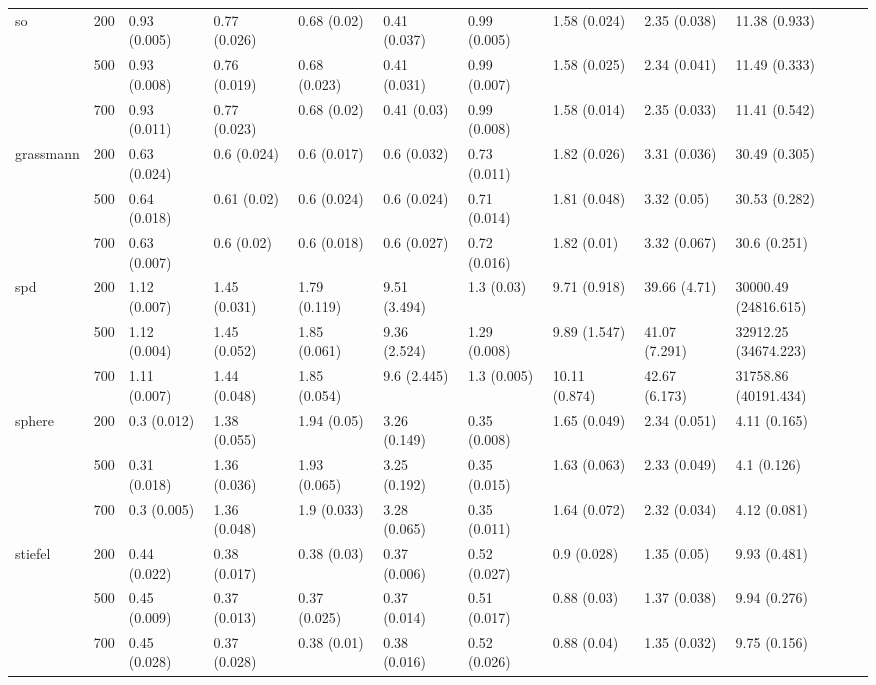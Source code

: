 \begin{tabular}{llllllllll}
\cline{1-10}
\multirow[t]{3}{*}{so} & 200 & 0.93 (0.005) & 0.77 (0.026) & 0.68 (0.02) & 0.41 (0.037) & 0.99 (0.005) & 1.58 (0.024) & 2.35 (0.038) & 11.38 (0.933) \\
 & 500 & 0.93 (0.008) & 0.76 (0.019) & 0.68 (0.023) & 0.41 (0.031) & 0.99 (0.007) & 1.58 (0.025) & 2.34 (0.041) & 11.49 (0.333) \\
 & 700 & 0.93 (0.011) & 0.77 (0.023) & 0.68 (0.02) & 0.41 (0.03) & 0.99 (0.008) & 1.58 (0.014) & 2.35 (0.033) & 11.41 (0.542) \\
\cline{1-10}
\multirow[t]{3}{*}{grassmann} & 200 & 0.63 (0.024) & 0.6 (0.024) & 0.6 (0.017) & 0.6 (0.032) & 0.73 (0.011) & 1.82 (0.026) & 3.31 (0.036) & 30.49 (0.305) \\
 & 500 & 0.64 (0.018) & 0.61 (0.02) & 0.6 (0.024) & 0.6 (0.024) & 0.71 (0.014) & 1.81 (0.048) & 3.32 (0.05) & 30.53 (0.282) \\
 & 700 & 0.63 (0.007) & 0.6 (0.02) & 0.6 (0.018) & 0.6 (0.027) & 0.72 (0.016) & 1.82 (0.01) & 3.32 (0.067) & 30.6 (0.251) \\
\cline{1-10}
\multirow[t]{3}{*}{spd} & 200 & 1.12 (0.007) & 1.45 (0.031) & 1.79 (0.119) & 9.51 (3.494) & 1.3 (0.03) & 9.71 (0.918) & 39.66 (4.71) & 30000.49 (24816.615) \\
 & 500 & 1.12 (0.004) & 1.45 (0.052) & 1.85 (0.061) & 9.36 (2.524) & 1.29 (0.008) & 9.89 (1.547) & 41.07 (7.291) & 32912.25 (34674.223) \\
 & 700 & 1.11 (0.007) & 1.44 (0.048) & 1.85 (0.054) & 9.6 (2.445) & 1.3 (0.005) & 10.11 (0.874) & 42.67 (6.173) & 31758.86 (40191.434) \\
\cline{1-10}
\multirow[t]{3}{*}{sphere} & 200 & 0.3 (0.012) & 1.38 (0.055) & 1.94 (0.05) & 3.26 (0.149) & 0.35 (0.008) & 1.65 (0.049) & 2.34 (0.051) & 4.11 (0.165) \\
 & 500 & 0.31 (0.018) & 1.36 (0.036) & 1.93 (0.065) & 3.25 (0.192) & 0.35 (0.015) & 1.63 (0.063) & 2.33 (0.049) & 4.1 (0.126) \\
 & 700 & 0.3 (0.005) & 1.36 (0.048) & 1.9 (0.033) & 3.28 (0.065) & 0.35 (0.011) & 1.64 (0.072) & 2.32 (0.034) & 4.12 (0.081) \\
\cline{1-10}
\multirow[t]{3}{*}{stiefel} & 200 & 0.44 (0.022) & 0.38 (0.017) & 0.38 (0.03) & 0.37 (0.006) & 0.52 (0.027) & 0.9 (0.028) & 1.35 (0.05) & 9.93 (0.481) \\
 & 500 & 0.45 (0.009) & 0.37 (0.013) & 0.37 (0.025) & 0.37 (0.014) & 0.51 (0.017) & 0.88 (0.03) & 1.37 (0.038) & 9.94 (0.276) \\
 & 700 & 0.45 (0.028) & 0.37 (0.028) & 0.38 (0.01) & 0.38 (0.016) & 0.52 (0.026) & 0.88 (0.04) & 1.35 (0.032) & 9.75 (0.156) \\
\cline{1-10}
\bottomrule
\end{tabular}
